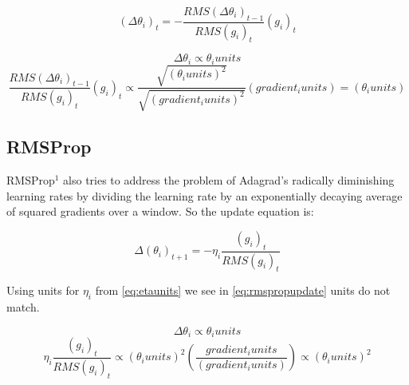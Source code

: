 \documentclass{article}
\begin{document}
	\begin{center} 
		\begin{equation}  (\Delta \theta_{i})_{t} = - \frac{RMS(\Delta \theta_{i})_{t-1} }{RMS(g_i)_{t}} (g_i)_{t} \end{equation}   
	\end{center}

	 \begin{center} 
		\begin{equation}  \Delta \theta_{i} \propto \theta_{i} units \end{equation}  
		\begin{equation} \frac{RMS(\Delta \theta_{i})_{t-1} }{RMS(g_i)_{t}} (g_i)_{t} \propto \frac{\sqrt{(\theta_{i} units)^{2}}} {\sqrt{(gradient_{i} units)^{2}}} (gradient_{i} units) = (\theta_{i} units) \end{equation}
	\end{center}

\subsection{RMSProp}
	RMSProp$^{1}$  also tries to address the problem of Adagrad's radically diminishing learning rates by dividing the learning rate by an exponentially decaying average of squared gradients over a window. So the update equation is:
	
	\begin{center} 
		\begin{equation} \Delta (\theta_{i})_{t+1} =  - \eta_{i} \frac{(g_i)_{t}}{RMS(g_i)_{t}} 	\label{eq:rmspropupdate} \end{equation}
	\end{center}

   Using units for $\eta_{i}$ from \ref{eq:etaunits} we see in \ref{eq:rmspropupdate} units do not match.
   
	 \begin{center} 
		\begin{equation}  \Delta \theta_{i} \propto \theta_{i} units \end{equation}  
		\begin{equation} \eta_{i} \frac {(g_i)_{t}} {RMS(g_i)_{t}} \propto (\theta_{i} units)^{2} (\frac{gradient_{i} units}{(gradient_{i} units)}) \propto (\theta_{i} units)^{2} \end{equation}
	\end{center}   
\end{document}
